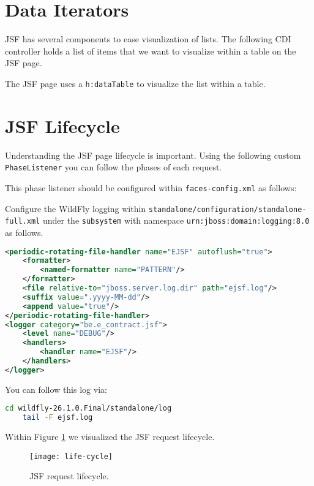 \section{Data Iterators}

JSF has several components to ease visualization of lists.
The following CDI controller holds a list of items that we want to visualize within a table on the JSF page.


The JSF page uses a \texttt{h:dataTable} to visualize the list within a table.



\section{JSF Lifecycle}
Understanding the JSF page lifecycle is important.
Using the following custom \texttt{PhaseListener} you can follow the phases of each request.

This phase listener should be configured within \texttt{faces-config.xml} as follows:

Configure the WildFly logging within \texttt{standalone/configuration/standalone-full.xml} under the \texttt{subsystem} with namespace \texttt{urn:jboss:domain:logging:8.0} as follows.
\begin{lstlisting}[language=XML]
<periodic-rotating-file-handler name="EJSF" autoflush="true">
	<formatter>
		<named-formatter name="PATTERN"/>
	</formatter>
	<file relative-to="jboss.server.log.dir" path="ejsf.log"/>
	<suffix value=".yyyy-MM-dd"/>
	<append value="true"/>
</periodic-rotating-file-handler>
<logger category="be.e_contract.jsf">
	<level name="DEBUG"/>
	<handlers>
		<handler name="EJSF"/>
	</handlers>
</logger>
\end{lstlisting}
You can follow this log via:
\begin{lstlisting}[language=bash]
	cd wildfly-26.1.0.Final/standalone/log
	tail -F ejsf.log
\end{lstlisting}
Within Figure \ref{fig:life-cycle} we visualized the JSF request lifecycle.
\begin{figure}[htbp]
	\begin{center}
		\texttt{[image: life-cycle]}
		\caption{JSF request lifecycle.}
		\label{fig:life-cycle}
	\end{center}
\end{figure}
